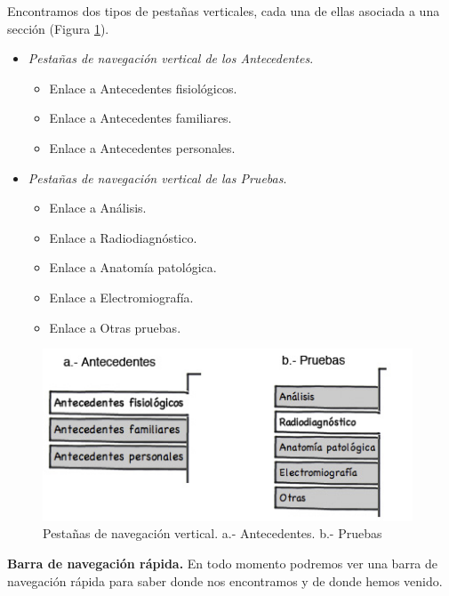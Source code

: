 		Encontramos dos tipos de pestañas verticales, cada una de ellas asociada a una sección (Figura \ref{fig:nav_ficha_lat1}).
		\begin{itemize}
			\item \textit{Pestañas de navegación vertical de los Antecedentes}. 
				\begin{itemize}
					\item Enlace a Antecedentes fisiológicos.
					\item Enlace a Antecedentes familiares.
					\item Enlace a Antecedentes personales.
				\end{itemize}
			\item \textit{Pestañas de navegación vertical de las Pruebas}.
				\begin{itemize}
					\item Enlace a Análisis.
					\item Enlace a Radiodiagnóstico.
					\item Enlace a Anatomía patológica.
					\item Enlace a Electromiografía.
					\item Enlace a Otras pruebas.
				\end{itemize}
		\end{itemize}
		
		\begin{figure}[H]
		  \centering
		    \includegraphics[width=11cm]{img/jpg/nav/fichamedica_lat.jpg}
		  \caption{Pestañas de navegación vertical. a.- Antecedentes. b.- Pruebas}
		  \label{fig:nav_ficha_lat1}
		\end{figure}
		
		
		\textbf{Barra de navegación rápida.} En todo momento podremos ver una barra de navegación rápida para saber donde nos encontramos y de donde hemos venido.
		
